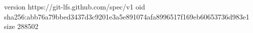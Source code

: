 version https://git-lfs.github.com/spec/v1
oid sha256:abb76a79bbed3437d3c9201e3a5e891074afa8996517f169eb60653736d983e1
size 288502
